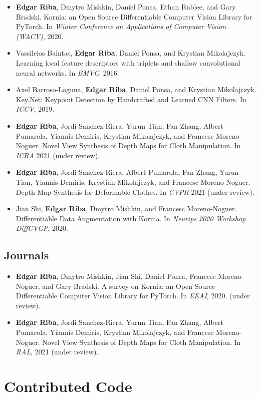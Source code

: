 \begin{itemize}
\item \textbf{Edgar Riba}, Dmytro Mishkin, Daniel Ponsa, Ethan Rublee, and Gary Bradski. Kornia: an Open Source Differentiable Computer Vision Library for PyTorch. In \textit{Winter Conference on Applications of Computer Vision (WACV)}, 2020.
\item Vassileios Balntas, \textbf{Edgar Riba}, Daniel Ponsa, and Krystian  Mikolajczyk. Learning local feature descriptors with triplets and shallow convolutional neural networks. In \textit{BMVC}, 2016.
\item Axel Barroso-Laguna, \textbf{Edgar Riba}, Daniel Ponsa, and Krystian Mikolajczyk. Key.Net: Keypoint Detection by Handcrafted and Learned CNN Filters. In \textit{ICCV}, 2019.
\item \textbf{Edgar Riba}, Jordi Sanchez-Riera, Yurun Tian, Fan Zhang, Albert Pumarola, Yiannis Demiris, Krystian Mikolajczyk, and Francesc Moreno-Noguer. Novel View Synthesis of Depth Maps for Cloth Manipulation. In \textit{ICRA} 2021 (under review).
\item \textbf{Edgar Riba}, Jordi Sanchez-Riera, Albert Pumarola, Fan Zhang, Yurun Tian, Yiannis Demiris, Krystian Mikolajczyk, and Francesc Moreno-Noguer. Depth Map Synthesis for Deformable Clothes. In \textit{CVPR} 2021 (under review).
\item Jian Shi, \textbf{Edgar Riba}, Dmytro Mishkin, and Francesc Moreno-Noguer. Differentiable Data Augmentation with Kornia. In \textit{Neurips 2020 Workshop DiffCVGP}, 2020.
\end{itemize}

\subsection{Journals}
\begin{itemize}
\item \textbf{Edgar Riba}, Dmytro Mishkin, Jian Shi, Daniel Ponsa, Francesc Moreno-Noguer, and  Gary Bradski. A survey on Kornia: an Open Source Differentiable Computer Vision Library for PyTorch. In \textit{EEAI}, 2020. (under review).
\item \textbf{Edgar Riba}, Jordi Sanchez-Riera, Yurun Tian, Fan Zhang, Albert Pumarola, Yiannis Demiris, Krystian Mikolajczyk, and Francesc Moreno-Noguer. Novel View Synthesis of Depth Maps for Cloth Manipulation. In \textit{RAL}, 2021 (under review).
\end{itemize}


\section{Contributed Code}

